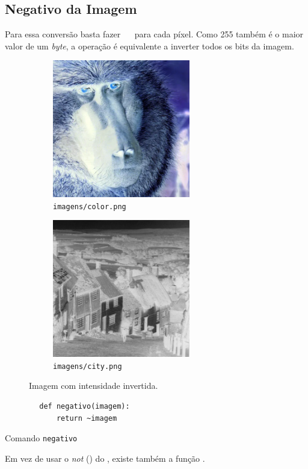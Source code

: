 \subsection{Negativo da Imagem}

Para essa conversão basta fazer ~~ para cada píxel. Como 255 também é o maior valor de um \textit{byte}, a operação é equivalente a inverter todos os bits da imagem.

\begin{figure}[H]
    \centering
    \begin{subfigure}{0.45\textwidth}
        \centering
        \includegraphics[width=6cm]{resultados/colorneg.png}
        \caption{\texttt{imagens/color.png}}
    \end{subfigure}%
    \begin{subfigure}{0.45\textwidth}
        \centering
        \includegraphics[width=6cm]{resultados/cityneg.png}
        \caption{\texttt{imagens/city.png}}
    \end{subfigure}

    \caption{Imagem com intensidade invertida.}
\end{figure}

\begin{listing}[H]
    \begin{verbatim}
        def negativo(imagem):
            return ~imagem
    \end{verbatim}

    \caption{Comando \texttt{negativo}}
\end{listing}

Em vez de usar o \textit{not} (\pyline{~}) do , existe também a função  \autocite{ref:bitwise_not}.
